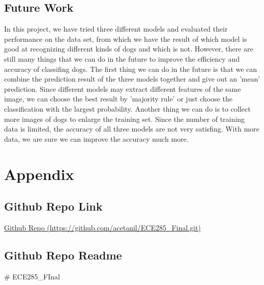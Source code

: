 \documentclass{article}
\begin{document}
\subsection{Future Work}
In this project, we have tried three different models and evaluated their performance on the data set, from which we have the result of which model is good at recognizing different kinds of dogs and which is not. However, there are still many things that we can do in the future to improve the efficiency and accuracy of classifing dogs. The first thing we can do in the future is that we can combine the prediction result of the three models together and give out an 'mean' prediction. Since different models may extract different features of the same image, we can choose the best result by 'majority rule' or just choose the classification with the largest probability. 
Another thing we can do is to collect more images of dogs to enlarge the training set. Since the number of training data is limited, the accuracy of all three models are not very satisfing. With more data, we are sure we can improve the accuracy much more.
\section{Appendix}
\subsection{Github Repo Link}
\href{https://github.com/acetanil/ECE285\_Final.git}{Github Repo (https://github.com/acetanil/ECE285\_Final.git)}
\subsection{Github Repo Readme}
\# ECE285\_FInal
\end{document}
